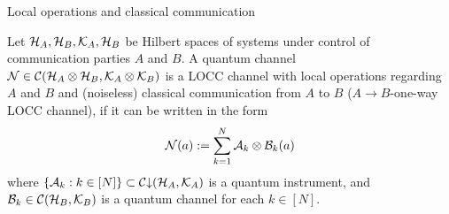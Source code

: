 \begin{subsection}{Local operations and classical communication}
 \begin{definition}
 Let ${\mathcal H}_A, {\mathcal H}_B, {\mathcal K}_A, {\mathcal H}_B$ be Hilbert spaces of systems under control of communication parties $A$ and $B$. A quantum channel ${\mathcal N} \in {\mathcal C}({\mathcal H}_A \otimes {\mathcal H}_B, {\mathcal K}_A \otimes {\mathcal K}_B)$ is a LOCC channel with local operations regarding $A$ and $B$ and (noiseless) classical communication from $A$ to $B$ ($A\rightarrow B$-one-way LOCC channel), if it can be written in the form
 \begin{align}
  {\mathcal N}(a) := \sum_{k=1}^N {\mathcal A}_k \otimes {\mathcal B}_k (a) 
 \end{align}
 where $\{{\mathcal A}_k: k \in [N]\}\subset {\mathcal C}{\downarrow}({\mathcal H}_A, {\mathcal K}_A)$ is a quantum instrument, and ${\mathcal B}_k \in {\mathcal C}({\mathcal H}_B,{\mathcal K}_B)$ is a quantum channel for each $k \in [N]$. 
 \end{definition} 
\end{subsection}
